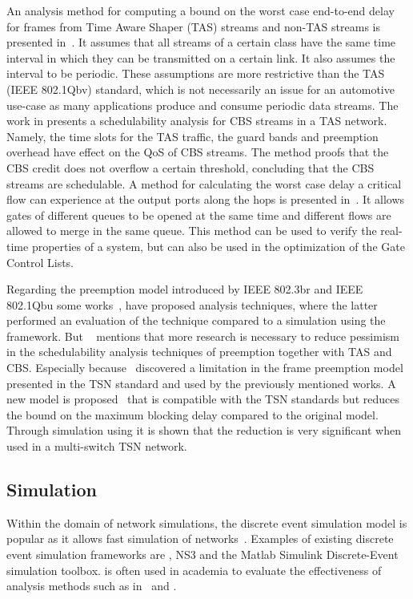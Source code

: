 An analysis method for computing a bound on the worst case end-to-end delay for frames from Time Aware Shaper (TAS) streams and non-TAS streams is presented in~\cite{thiele2015formal}. It assumes that all streams of a certain class have the same time interval in which they can be transmitted on a certain link. It also assumes the interval to be periodic. These assumptions are more restrictive than the TAS (IEEE 802.1Qbv) standard, which is not necessarily an issue for an automotive use-case as many applications produce and consume periodic data streams. The work in \cite{zhao2018timing} presents a schedulability analysis for CBS streams in a TAS network. Namely, the time slots for the TAS traffic, the guard bands and preemption overhead have effect on the QoS of CBS streams. The method proofs that the CBS credit does not overflow a certain threshold, concluding that the CBS streams are schedulable. A method for calculating the worst case delay a critical flow can experience at the output ports along the hops is presented in~\cite{zhao2018worst}. It allows gates of different queues to be opened at the same time and different flows are allowed to merge in the same queue. This method can be used to verify the real-time properties of a system, but can also be used in the optimization of the Gate Control Lists.

Regarding the preemption model introduced by IEEE 802.3br and IEEE 802.1Qbu some works~\cite{thiele2016formal},\cite{bello2020schedulability} have proposed analysis techniques, where the latter performed an evaluation of the technique compared to a simulation using the \omnet framework. But ~\cite{ashjaei2021time} mentions that more research is necessary to reduce pessimism in the schedulability analysis techniques of preemption together with TAS and CBS. Especially because~\cite{ashjaei2021novel} discovered a limitation in the frame preemption model presented in the TSN standard and used by the previously mentioned works. A new model is proposed~\cite{ashjaei2021novel} that is compatible with the TSN standards but reduces the bound on the maximum blocking delay compared to the original model. Through simulation using \omnet it is shown that the reduction is very significant when used in a multi-switch TSN network.

\subsection{Simulation}
Within the domain of network simulations, the discrete event simulation model is popular as it allows fast simulation of networks~\cite{ashjaei2021time}. Examples of existing discrete event simulation frameworks are \omnet, NS3 and the Matlab Simulink Discrete-Event simulation toolbox. \omnet is often used in academia to evaluate the effectiveness of analysis methods such as in~\cite{bello2020schedulability} and \cite{ashjaei2021novel}.

